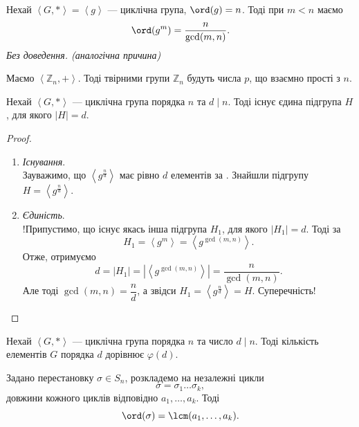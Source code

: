 \documentclass{math_library}
\begin{document}
\begin{proposition}
\label{ord_g_to_some_power}
Нехай $\left< G, * \right> = \left<g\right>$ --- циклічна група, $\ord (g) = n$. Тоді при $m < n$ маємо
\begin{align*}
\ord (g^m) =  \dfrac{n}{\gcd(m,n)}.
\end{align*}
\textit{Без доведення. (аналогічна причина)}
\end{proposition}

\begin{example}
Маємо $\left< \mathbb{Z}_n, + \right>$. Тоді твірними групи $\mathbb{Z}_n$ будуть числа $p$, що взаємно прості з $n$.
\end{example}

\begin{theorem}
\label{from_generated_group_get_subgroup}
Нехай $\left< G, *\right>$ --- циклічна група порядка $n$ та $d \mid n$. Тоді існує єдина підгрупа $H$, для якого $|H| = d$.
\end{theorem}

\begin{proof}
\begin{enumerate}[topsep=0pt,wide=0pt,label={\Roman*.}]
\item \textit{Існування}.\\
Зауважимо, що $\left< g^{\frac{n}{d}} \right>$ має рівно $d$ елементів за . Знайшли підгрупу $H = \left< g^{\frac{n}{d}} \right>$.

\item \textit{Єдиність}.\\
!Припустимо, що існує якась інша підгрупа $H_1$, для якого $|H_1| = d$. Тоді за  \[
H_1 = \left<g^m\right> = \left<g^{\gcd(m,n)}\right>.
\]
Отже, отримуємо \[
d = |H_1| = \left|\left<g^{\gcd(m,n)}\right>\right| = \dfrac{n}{\gcd(m,n)}. 
\]
Але тоді $\gcd(m,n) = \dfrac{n}{d}$, а звідси $H_1 = \left< g^{\frac{n}{d}} \right> = H$. Суперечність! \qedhere
\end{enumerate}
\end{proof}

\begin{corollary}
Нехай $\left< G, *\right>$ --- циклічна група порядка $n$ та число $d \mid n$. Тоді кількість елементів $G$ порядка $d$ дорівнює $\varphi(d)$.
\end{corollary}

\begin{theorem}
Задано перестановку $\sigma \in S_n$, розкладемо на незалежні цикли \[\sigma = \sigma_1 \dots \sigma_k, \] довжини кожного циклів відповідно $a_1,\dots,a_k$. Тоді \[
\ord (\sigma) = \lcm(a_1,\dots,a_k).
\]
\end{theorem}
\end{document}
